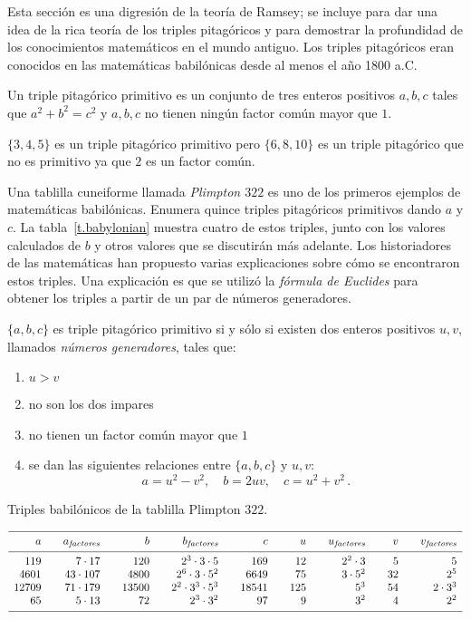 Esta sección es una digresión de la teoría de Ramsey; se incluye para dar una idea de la rica teoría de los triples pitagóricos y para demostrar la profundidad de los conocimientos matemáticos en el mundo antiguo. Los triples pitagóricos eran conocidos en las matemáticas babilónicas desde al menos el año 1800 a.C.
\begin{definition}
Un triple pitagórico primitivo es un conjunto de tres enteros positivos ${a,b,c}$ tales que $a^2+b^2=c^2$ y $a,b,c$ no tienen ningún factor común mayor que $1$.
\end{definition}
\begin{example}
$\{3,4,5\}$ es un triple pitagórico primitivo pero $\{6,8,10\}$ es un triple pitagórico que no es primitivo ya que $2$ es un factor común.
\end{example}
Una tablilla cuneiforme llamada \emph{Plimpton $322$} es uno de los primeros ejemplos de matemáticas babilónicas. Enumera quince triples pitagóricos primitivos dando $a$ y $c$. La tabla~\ref{t.babylonian} muestra cuatro de estos triples, junto con los valores calculados de $b$ y otros valores que se discutirán más adelante. Los historiadores de las matemáticas han propuesto varias explicaciones sobre cómo se encontraron estos triples. Una explicación es que se utilizó la \emph{fórmula de Euclides} para obtener los triples a partir de un par de números generadores.
\begin{theorem}[Euclid]
$\{a,b,c\}$ es triple pitagórico primitivo si y sólo si existen dos enteros positivos $u,v$, llamados \emph{números generadores}, tales que:\label{thm.euclid-function}
\begin{enumerate}
\item $u>v$
\item no son los dos impares
\item no tienen un factor común mayor que $1$
\item se dan las siguientes relaciones entre $\{a,b,c\}$ y $u,v$:
\[
a=u^2-v^2,\quad b=2uv,\quad c=u^2+v^2\,.
\]
\end{enumerate}
\end{theorem}

\begin{table}[b]
\caption{Triples babilónicos de la tablilla Plimpton $322$.}\label{t.babylonian}
\[
\begin{array}{r@{$\quad\quad$}r@{$\quad\quad$}r@{$\quad\quad$}r@{$\quad\quad$}r@{$\quad\quad$}r@{$\quad\quad$}r@{$\quad\quad$}r@{$\quad\quad$}r}
\hline
\noalign{\smallskip}
a&a_{\textit{factores}}&b&b_{\textit{factores}}&c&u&u_{\textit{factores}}&v&v_{\textit{factores}}\\
\noalign{\smallskip}\hline\noalign{\smallskip}
119&7\cdot 17 &120&2^3 \cdot 3\cdot 5 & 169&12&2^2\cdot 3&5&5\\
4601 &43\cdot 107&4800&2^6 \cdot 3 \cdot 5^2& 6649&75&3\cdot 5^2&32&2^5\\
12709 &71\cdot 179&13500&2^2 \cdot 3^3 \cdot 5^3& 18541&125&5^3&54&2\cdot 3^3\\
65 &5\cdot 13&72&2^3 \cdot 3^2 & 97&9&3^2&4&2^2\\
\noalign{\smallskip}\hline
\end{array}
\]
\end{table}

